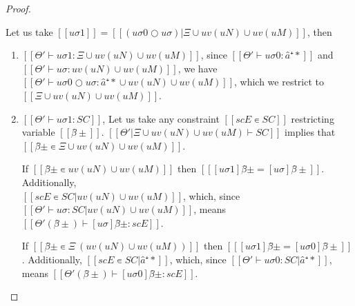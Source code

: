 \begin{proof}
\begin{caseof}
\begin{enumerate}
\begin{itemize}
                            Let us take $[[uσ1]] = [[(uσ0 ○ uσ)|Ξ ∪ uv(uN) ∪ uv(uM)]]$, then 
                            \begin{enumerate}
                                \item $[[Θ' ⊢ uσ1 : Ξ ∪ uv(uN) ∪ uv(uM)]]$,
                                    since $[[Θ' ⊢ uσ0 : {â⁺*}]]$ and 
                                    $[[ Θ' ⊢ uσ : uv(uN) ∪ uv(uM) ]]$, 
                                    we have 
                                    $[[Θ' ⊢ uσ0 ○ uσ : {â⁺*} ∪ uv(uN) ∪ uv(uM)]]$, 
                                    which we restrict to $[[Ξ ∪ uv(uN) ∪ uv(uM)]]$.
                                \item $[[Θ' ⊢ uσ1 : SC]]$,
                                    Let us take any constraint $[[scE ∊ SC]]$ restricting 
                                    variable $[[β̂±]]$.
                                    $[[Θ'|Ξ ∪ uv(uN) ∪ uv(uM) ⊢ SC]]$
                                    implies that $[[β̂± ∊ Ξ ∪ uv(uN) ∪ uv(uM)]]$.

                                    If $[[β̂± ∊ uv(uN) ∪ uv(uM)]]$ then 
                                    $[[ [uσ1]β̂± = [uσ]β̂± ]]$.
                                    Additionally,\\ $[[scE ∊ SC | uv(uN) ∪ uv(uM)]]$,
                                    which, since $[[ Θ' ⊢ uσ : SC | uv(uN) ∪ uv(uM) ]]$,
                                    means $[[Θ'(β̂±) ⊢ [uσ]β̂± : scE]]$.

                                    If $[[β̂± ∊ Ξ \ (uv(uN) ∪ uv(uM))]]$ then
                                    $[[ [uσ1]β̂± = [uσ0]β̂± ]]$.
                                    Additionally, $[[scE ∊ SC | {â⁺*}]]$,
                                    which, since $[[ Θ' ⊢ uσ0 : SC | {â⁺*} ]]$,
                                    means $[[Θ'(β̂±) ⊢ [uσ0]β̂± : scE]]$.


\end{enumerate}
\end{itemize}
\end{enumerate}
\end{caseof}
\end{proof}
